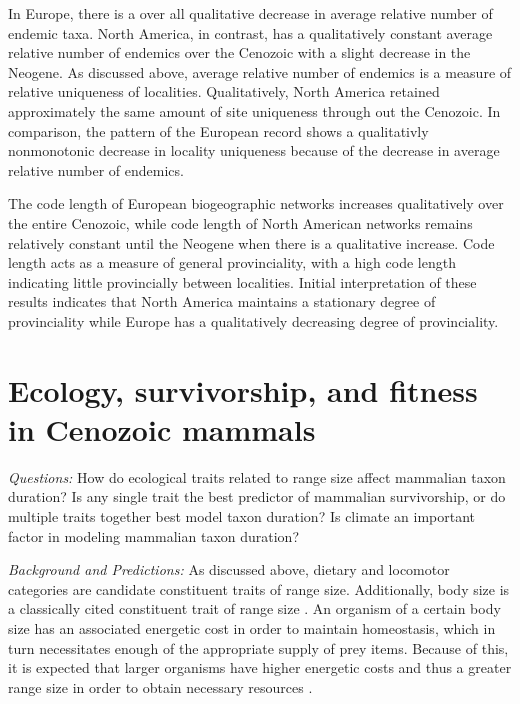\documentclass[12pt,letterpaper]{article}
\begin{document}
In Europe, there is a over all qualitative decrease in average relative number of endemic taxa. North America, in contrast, has a qualitatively constant average relative number of endemics over the Cenozoic with a slight decrease in the Neogene. As discussed above, average relative number of endemics is a measure of relative uniqueness of localities. Qualitatively, North America retained approximately the same amount of site uniqueness through out the Cenozoic. In comparison, the pattern of the European record shows a qualitativly nonmonotonic decrease in locality uniqueness because of the decrease in average relative number of endemics.

The code length of European biogeographic networks increases qualitatively over the entire Cenozoic, while code length of North American networks remains relatively constant until the Neogene when there is a qualitative increase. Code length acts as a measure of general provinciality, with a high code length indicating little provincially between localities. Initial interpretation of these results indicates that North America maintains a stationary degree of provinciality while Europe has a qualitatively decreasing degree of provinciality. %


\section{Ecology, survivorship, and fitness in Cenozoic mammals}

\textit{Questions:} 
How do ecological traits related to range size affect mammalian taxon duration? Is any single trait the best predictor of mammalian survivorship, or do multiple traits together best model taxon duration? Is climate an important factor in modeling mammalian taxon duration?

\textit{Background and Predictions:} 
As discussed above, dietary and locomotor categories are candidate constituent traits of range size. Additionally, body size is a classically cited constituent trait of range size \citep{Smith2004,Smith2008b,Damuth1981a,Damuth1979}. An organism of a certain body size has an associated energetic cost in order to maintain homeostasis, which in turn necessitates enough of the appropriate supply of prey items. Because of this, it is expected that larger organisms have higher energetic costs and thus a greater range size in order to obtain necessary resources \citep{Damuth1979,Brown1987,Damuth1979,Lyons2010}.
\end{document}
